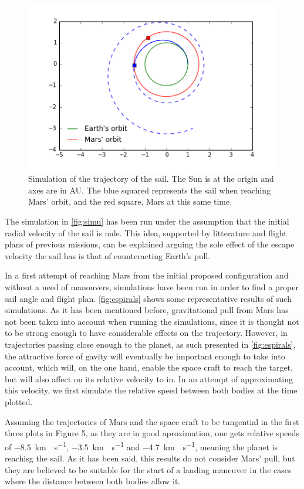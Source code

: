 \documentclass[twocolumn,12pt,a4paper]{article}
\numberwithin{equation}{section}
\begin{document}
\begin{figure}[h]
	\centering
	\includegraphics[scale=0.5]{simu.png}
	\caption{\small Simulation of the trajectory of the sail. The Sun is at the origin and axes are in AU. The blue squared represents the sail when reaching Mars' orbit, and the red square, Mars at this same time.}
	\label{fig:simu}

\end{figure} 
The simulation in  \autoref{fig:simu} has been run under the assumption that the initial radial velocity of the sail is nule. This idea, supported by litterature and flight plans of previous missions, can be explained arguing the sole effect of the escape velocity the sail has is that of counteracting Earth's pull.


In a first attempt of reaching Mars from the initial proposed configuration and without a need of manouvers, simulations have been run in order to find a proper sail angle and flight plan. \autoref{fig:espirals} shows some representative results of such simulations. As it has been mentioned before, gravitational pull from Mars has not been taken into account when running the simulations, since it is thought not to be strong enough to have considerable effects on the trajectory. However, in trajectories passing close enough to the planet, as such presented in \autoref{fig:espirals}, the attractive force of gavity will eventually be important enough to take into account, which will, on the one hand, enable the space craft to reach the target, but will also affect on its relative velocity to in. In an attempt of approximating this velocity, we first simulate the relative speed between both bodies at the time plotted.

Assuming the trajectories of Mars and the space craft to be tangential in the first three plots in Figure 5, as they are in good aproximation, one gets relative speeds of \SI{-8,5}{km\cdot s^{-1}}, \SI{-3.5}{km\cdot s^{-1}}  and \SI{-4.7}{km\cdot s^{-1}}, meaning the planet is reachisg the sail. As it has been said, this results do not consider Mars' pull,  but they are believed to be suitable for the start of a landing maneuver in the cases where the distance between both bodies allow it.
\end{document}
